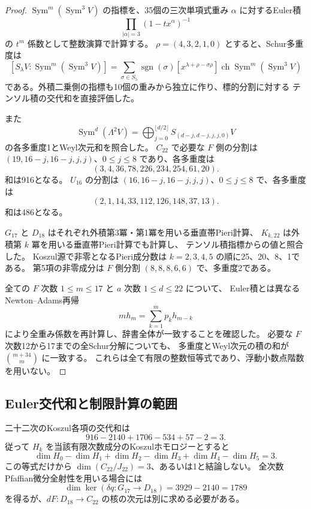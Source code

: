 \begin{proof}
$\operatorname{Sym}^m(\operatorname{Sym}^3V)$ の指標を、35個の三次単項式重み
$\alpha$ に対するEuler積
\[
 \prod_{|\alpha|=3}(1-tx^\alpha)^{-1}
\]
の $t^m$ 係数として整数演算で計算する。
$\rho=(4,3,2,1,0)$ とすると、Schur多重度は
\[
 [S_\lambda V:\operatorname{Sym}^m(\operatorname{Sym}^3V)]
 =\sum_{\sigma\in S_5}\operatorname{sgn}(\sigma)
 [x^{\lambda+\rho-\sigma\rho}]
 \operatorname{ch}\operatorname{Sym}^m(\operatorname{Sym}^3V)
\]
である。外積二乗側の指標も10個の重みから独立に作り、標的分割に対する
テンソル積の交代和を直接評価した。

また
\[
 \operatorname{Sym}^{d}(\Lambda^2V)
 =\bigoplus_{j=0}^{\lfloor d/2\rfloor}S_{(d-j,d-j,j,j,0)}V
\]
の各多重度1とWeyl次元和を照合した。
$C_{22}$ で必要な $F$ 側の分割は
$(19,16-j,16-j,j,j)$、$0\leq j\leq8$ であり、各多重度は
\[
 (3,4,36,78,226,234,254,61,20).
\]
和は916となる。
$U_{16}$ の分割は $(16,16-j,16-j,j,j)$、$0\leq j\leq8$ で、各多重度は
\[
 (2,1,14,33,112,126,148,37,13).
\]
和は486となる。

$G_{17}$ と $D_{18}$ はそれぞれ外積第3冪・第1冪を用いる垂直帯Pieri計算、
$K_{k,22}$ は外積第 $k$ 冪を用いる垂直帯Pieri計算でも計算し、
テンソル積指標からの値と照合した。
Koszul源で非零となるPieri成分数は $k=2,3,4,5$ の順に25、20、8、1である。
第5項の非零成分は $F$ 側分割 $(8,8,8,6,6)$ で、多重度2である。

全ての $F$ 次数 $1\leq m\leq17$ と $a$ 次数 $1\leq d\leq22$ について、
Euler積とは異なるNewton--Adams再帰
\[
 m h_m=\sum_{k=1}^m p_kh_{m-k}
\]
により全重み係数を再計算し、辞書全体が一致することを確認した。
必要な $F$ 次数12から17までの全Schur分解についても、
多重度とWeyl次元の積の和が $\binom{m+34}{m}$ に一致する。
これらは全て有限の整数恒等式であり、浮動小数点階数を用いない。
\end{proof}

\subsection{Euler交代和と制限計算の範囲}

二十二次のKoszul各項の交代和は
\[
 916-2140+1706-534+57-2=3.
\]
従って $H_k$ を当該有限次数成分のKoszulホモロジーとすると
\[
 \dim H_0-\dim H_1+\dim H_2-\dim H_3+\dim H_4-\dim H_5=3.
\]
この等式だけから $\dim(C_{22}/J_{22})=3$、あるいは1と結論しない。
全次数Pfaffian微分全射性を用いる場合には
\[
 \dim\ker(\delta q:G_{17}\longrightarrow D_{18})=3929-2140=1789
\]
を得るが、$dF:D_{18}\to C_{22}$ の核の次元は別に求める必要がある。

